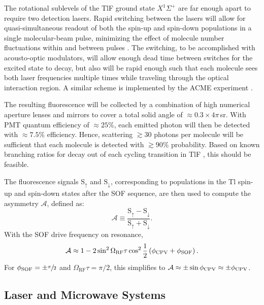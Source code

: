 The rotational sublevels of the TlF ground state $X^1\Sigma^+$ are far enough apart to require two detection lasers. Rapid switching between the lasers will allow for quasi\hyp{}simultaneous readout of both the spin-up and spin-down populations in a single molecular-beam pulse, minimizing the effect of molecule number fluctuations within and between pulses \cite{kirilov2013shotnoise}. The switching, to be accomplished with acousto-optic modulators, will allow enough dead time between switches for the excited state to decay, but also will be rapid enough such that each molecule sees both laser frequencies multiple times while traveling through the optical interaction region. A similar scheme is implemented by the ACME experiment \cite{andreev_improved_2018}. 

The resulting fluorescence will be collected by a combination of high numerical aperture lenses and mirrors to cover a total solid angle of $\approx 0.3\! \times\! 4\pi$\,sr.  With PMT quantum efficiency of $\approx 25\%$, each emitted photon will then be detected with $\approx 7.5\% $ efficiency.  Hence, scattering $\gtrsim 30$ photons per molecule will be sufficient that each molecule is detected with $\gtrsim 90\%$ probability. Based on known branching ratios for decay out of each cycling transition in TlF \cite{norrgard2017hyperfine}, this should be feasible.

The fluorescence signals $\mathrm{S}_\uparrow$ and $\mathrm{S}_\downarrow$, corresponding to populations in the Tl spin-up and spin-down states after the SOF sequence, are then used to compute the asymmetry $\mathcal{A}$, defined as: 
\begin{equation}
    \mathcal{A} \equiv \frac{\mathrm{S}_\uparrow - \mathrm{S}_\downarrow}{\mathrm{S}_\uparrow + \mathrm{S}_\downarrow}.
\end{equation}
With the SOF drive frequency on resonance,  
\begin{equation}
    \mathcal{A} \approx 1 - 2\sin^2 \Omega_\text{RF}\tau\cos^2 \frac{1}{2}\left(\phi_{\rm CPV} + \phi_\mathrm{SOF}\right).
\end{equation}
For $\phi_\mathrm{SOF} = \pm \sfrac{\pi}{2}$ and $\Omega_\text{RF}\tau=\pi/2$, this simplifies to $\mathcal{A} \approx \pm \sin\phi_{\rm CPV} \approx \pm \phi_{\rm CPV}$.

\subsection{Laser and Microwave Systems}

